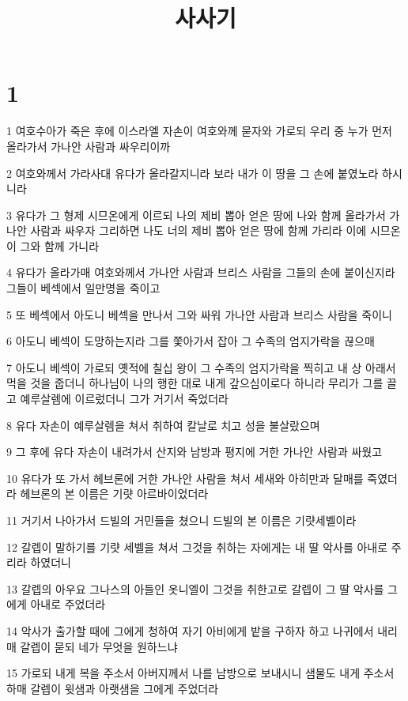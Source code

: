 

\title{사사기}


\chapter{1}

\par 1 여호수아가 죽은 후에 이스라엘 자손이 여호와께 묻자와 가로되 우리 중 누가 먼저 올라가서 가나안 사람과 싸우리이까
\par 2 여호와께서 가라사대 유다가 올라갈지니라 보라 내가 이 땅을 그 손에 붙였노라 하시니라
\par 3 유다가 그 형제 시므온에게 이르되 나의 제비 뽑아 얻은 땅에 나와 함께 올라가서 가나안 사람과 싸우자 그리하면 나도 너의 제비 뽑아 얻은 땅에 함께 가리라 이에 시므온이 그와 함께 가니라
\par 4 유다가 올라가매 여호와께서 가나안 사람과 브리스 사람을 그들의 손에 붙이신지라 그들이 베섹에서 일만명을 죽이고
\par 5 또 베섹에서 아도니 베섹을 만나서 그와 싸워 가나안 사람과 브리스 사람을 죽이니
\par 6 아도니 베섹이 도망하는지라 그를 쫓아가서 잡아 그 수족의 엄지가락을 끊으매
\par 7 아도니 베섹이 가로되 옛적에 칠십 왕이 그 수족의 엄지가락을 찍히고 내 상 아래서 먹을 것을 줍더니 하나님이 나의 행한 대로 내게 갚으심이로다 하니라 무리가 그를 끌고 예루살렘에 이르렀더니 그가 거기서 죽었더라
\par 8 유다 자손이 예루살렘을 쳐서 취하여 칼날로 치고 성을 불살랐으며
\par 9 그 후에 유다 자손이 내려가서 산지와 남방과 평지에 거한 가나안 사람과 싸웠고
\par 10 유다가 또 가서 헤브론에 거한 가나안 사람을 쳐서 세새와 아히만과 달매를 죽였더라 헤브론의 본 이름은 기럇 아르바이었더라
\par 11 거기서 나아가서 드빌의 거민들을 쳤으니 드빌의 본 이름은 기럇세벨이라
\par 12 갈렙이 말하기를 기럇 세벨을 쳐서 그것을 취하는 자에게는 내 딸 악사를 아내로 주리라 하였더니
\par 13 갈렙의 아우요 그나스의 아들인 옷니엘이 그것을 취한고로 갈렙이 그 딸 악사를 그에게 아내로 주었더라
\par 14 악사가 출가할 때에 그에게 청하여 자기 아비에게 밭을 구하자 하고 나귀에서 내리매 갈렙이 묻되 네가 무엇을 원하느냐
\par 15 가로되 내게 복을 주소서 아버지께서 나를 남방으로 보내시니 샘물도 내게 주소서 하매 갈렙이 윗샘과 아랫샘을 그에게 주었더라
